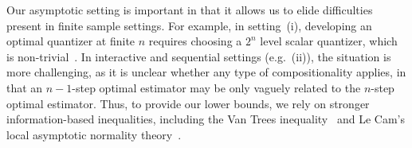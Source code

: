 
Our asymptotic setting is important in that it allows us to elide
difficulties present in finite sample settings. For example, in setting~(i),
developing an optimal quantizer at finite $n$ requires choosing a $2^n$
level scalar quantizer, which is non-trivial~\cite{gray1998quantization}.
In interactive and sequential settings (e.g.~(ii)), the situation is more
challenging, as it is unclear whether any type of compositionality applies,
in that an $n-1$-step optimal estimator may be only vaguely related to the
$n$-step optimal estimator. Thus, to provide our lower bounds, we rely on
stronger information-based inequalities, including the Van Trees
inequality~\cite{Tsybakov09} and Le Cam's local asymptotic normality
theory~\cite{LeCam86,LeCamYa00,VanDerVaart98}.

